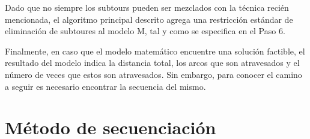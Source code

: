 Dado que no siempre los subtours pueden ser mezclados con la técnica recién mencionada, el algoritmo principal descrito agrega una restricción estándar de eliminación de subtoures al modelo M, tal y como se especifica en el Paso 6.

Finalmente, en caso que el modelo matemático encuentre una solución factible, el resultado del modelo indica la distancia total, los arcos que son atravesados y el número de veces que estos son atravesados. Sin embargo, para conocer el camino a seguir es necesario encontrar la secuencia del mismo. 

\section{Método de secuenciación}




